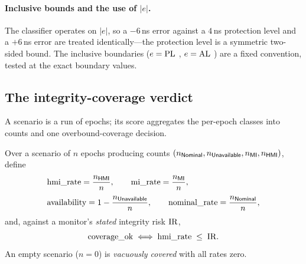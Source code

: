 \paragraph{Inclusive bounds and the use of $|e|$.}
The classifier operates on $|e|$, so a $-6$\,ns error against a $4$\,ns protection
level and a $+6$\,ns error are treated identically---the protection level is a
symmetric two-sided bound. The inclusive boundaries ($e=\mathrm{PL}$ \Nominal{}, $e=\mathrm{AL}$
\MI{}) are a fixed convention, tested at the exact boundary values.

\subsection{The integrity-coverage verdict}
\label{sec:coverage}

A scenario is a run of epochs; its score aggregates the per-epoch classes into
counts and one overbound-coverage decision.

\begin{definition}
\label{def:coverage}
Over a scenario of $n$ epochs producing counts
$(n_{\textsf{Nominal}{}},n_{\textsf{Unavailable}{}},n_{\textsf{MI}{}},n_{\textsf{HMI}{}})$, define
\begin{equation}
\begin{aligned}
  &\mathrm{hmi\_rate}=\frac{n_{\textsf{HMI}{}}}{n},\qquad
  \mathrm{mi\_rate}=\frac{n_{\textsf{MI}{}}}{n},\\[3pt]
  &\mathrm{availability}=1-\frac{n_{\textsf{Unavailable}{}}}{n},\qquad
  \mathrm{nominal\_rate}=\frac{n_{\textsf{Nominal}{}}}{n},
\end{aligned}
  \label{eq:rates}
\end{equation}
and, against a monitor's \emph{stated} integrity risk $\mathrm{IR}$,
\begin{equation}
  \mathrm{coverage\_ok} \;\Longleftrightarrow\; \mathrm{hmi\_rate} \;\le\; \mathrm{IR} .
  \label{eq:covok}
\end{equation}
An empty scenario ($n=0$) is \emph{vacuously covered} with all rates zero.
\end{definition}

